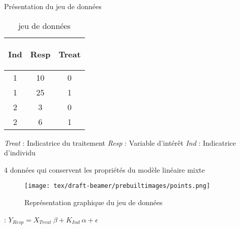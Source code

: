\documentclass[unknownkeysallowed]{beamer}
\begin{document}
\begin{frame}{Présentation du jeu de données}

	 \begin{table}
        \centering
        \begin{tabular}{| c | c | c|}
        \hline
        \begin{bf} Ind \end{bf} &
        \begin{bf} Resp \end{bf} &
        \begin{bf} Treat \end{bf} \\
        \hline
        1 &  10 & 0\\
        1 & 25 & 1 \\
        2 & 3 & 0 \\
        2 &  6 & 1\\
        \hline
        \end{tabular}
    \caption{jeu de données}
    \end{table}

\vspace{4mm}

\emph{Treat} : Indicatrice du traitement \newline
\emph{Resp} : Variable d'intérêt \newline
\emph{Ind} : Indicatrice d'individu

\end{frame}


\begin{frame}{4 données qui conservent les propriétés du modèle linéaire mixte}

\begin{figure}[H]
\centering
\texttt{[image: tex/draft-beamer/prebuiltimages/points.png]}
\caption{Représentation graphique du jeu de données}
\end{figure}

 : $Y_{Resp} = X_{Treat} \ \beta + K_{Ind} \ \alpha + \epsilon$


\end{frame}

\end{document}
